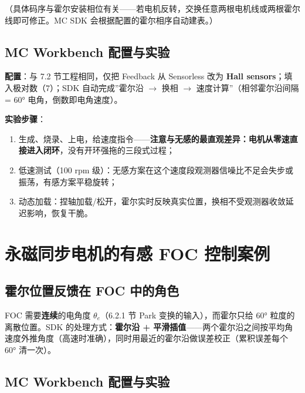 \documentclass[
  UTF8,
  scheme=plain,
  fontsize=10pt,
  openany
]{ctexbook}
\begin{document}
（具体码序与霍尔安装相位有关------若电机反转，交换任意两根电机线或两根霍尔线即可修正。MC
SDK 会根据配置的霍尔相序自动建表。）

\subsection{MC Workbench
配置与实验}\label{mc-workbench-ux914dux7f6eux4e0eux5b9eux9a8c}

\textbf{配置}：与 7.2 节工程相同，仅把 Feedback 从 Sensorless 改为
\textbf{Hall sensors}；填入极对数（7）；SDK 自动完成''霍尔沿
\(\rightarrow\) 换相 \(\rightarrow\) 速度计算''（相邻霍尔沿间隔 = 60°
电角，倒数即电角速度）。

\textbf{实验步骤}：

\begin{enumerate}
\def\labelenumi{\arabic{enumi}.}
\tightlist
\item
  生成、烧录、上电，给速度指令------\textbf{注意与无感的最直观差异：电机从零速直接进入闭环}，没有开环强拖的三段式过程；
\item
  低速测试（100 rpm
  级）：无感方案在这个速度段观测器信噪比不足会失步或振荡，有感方案平稳旋转；
\item
  动态加载：捏轴加载/松开，霍尔实时反映真实位置，换相不受观测器收敛延迟影响，恢复干脆。
\end{enumerate}

\section{永磁同步电机的有感 FOC
控制案例}\label{ux6c38ux78c1ux540cux6b65ux7535ux673aux7684ux6709ux611f-foc-ux63a7ux5236ux6848ux4f8b}

\subsection{霍尔位置反馈在 FOC
中的角色}\label{ux970dux5c14ux4f4dux7f6eux53cdux9988ux5728-foc-ux4e2dux7684ux89d2ux8272}

FOC 需要\textbf{连续}的电角度 \(\theta_e\)（6.2.1 节 Park
变换的输入），而霍尔只给 60° 粒度的离散位置。SDK
的处理方式：\textbf{霍尔沿 +
平滑插值}------两个霍尔沿之间按平均角速度外推角度（高速时准确），同时用最近的霍尔沿做误差校正（累积误差每个
60° 清一次）。

\subsection{MC Workbench
配置与实验}\label{mc-workbench-ux914dux7f6eux4e0eux5b9eux9a8c-1}
\end{document}
